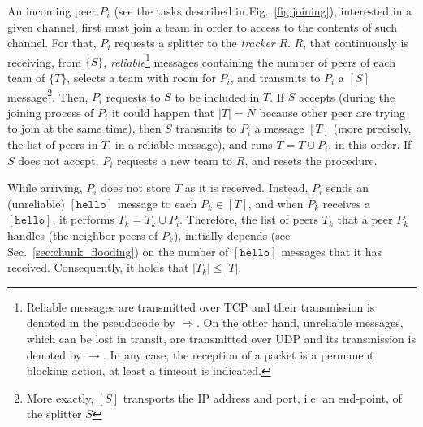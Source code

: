 
\label{sec:peer_joining}
\begin{figure*}
   \caption{Tasks involved in a peer
    joining. $P^t_i$ is the incoming peer, and $P^t_k$ is a peer that
    is already in the team. $R$ represents the tracker, and $S^t$ the
    splitter of the team $T^t$ to which $P^t_k$ belongs, and $P^t_i$
    will be added.\label{fig:joining}}
\end{figure*}
An incoming peer $P_i$ (see the tasks described in
Fig.~\ref{fig:joining}), interested in a given channel, first must
join a team in order to access to the contents of such channel. For
that, $P_i$ requests a splitter to the \emph{tracker} $R$. $R$, that
continuously is receiving, from $\{S\}$,
\emph{reliable}\footnote{Reliable messages are transmitted over TCP
  and their transmission is denoted in the pseudocode by
  $\Rightarrow$. On the other hand, unreliable messages, which can be
  lost in transit, are transmitted over UDP and its transmission is
  denoted by $\rightarrow$. In any case, the reception of a packet is
  a permanent blocking action, at least a timeout is indicated.}
messages containing the number of peers of each team of $\{T\}$,
selects a team with room for $P_i$, and transmits to $P_i$ a $[S]$
message\footnote{More exactly, $[S]$ transports the IP address and
  port, i.e. an end-point, of the splitter $S$}. Then, $P_i$ requests
to $S$ to be included in $T$. If $S$ accepts (during the joining
process of $P_i$ it could happen that $|T|=N$ because other peer are
trying to join at the same time), then $S$ transmits to $P_i$ a
message $[T]$ (more precisely, the list of peers in $T$, in a reliable
message), and runs $T = T \cup P_i$, in this order. If $S$ does not
accept, $P_i$ requests a new team to $R$, and resets the procedure.


While arriving, $P_i$ does not store $T$ as it is
received. Instead, $P_i$ sends an
(unreliable) $[\mathtt{hello}]$ message to each $P_k\in [T]$, and when
$P_k$ receives a $[\mathtt{hello}]$, it performs $T_k = T_k \cup
P_i$. Therefore, the list of peers $T_k$ that a peer $P_k$
handles (the neighbor peers of $P_k$), initially depends (see
Sec.~\ref{sec:chunk_flooding}) on the number of $[\mathtt{hello}]$
messages that it has received. Consequently, it holds that
$|T_k| \le |T|$.


